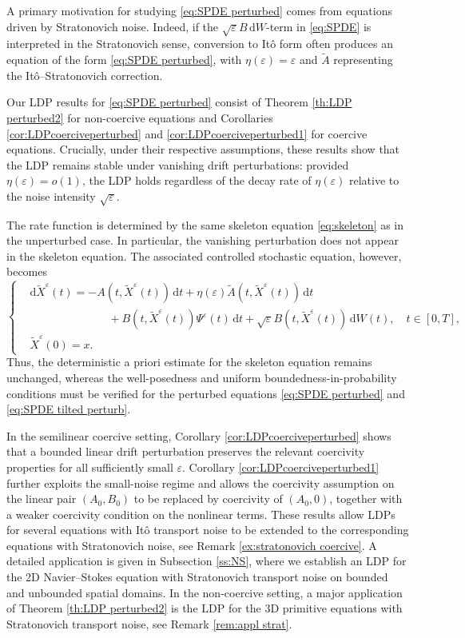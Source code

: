 \documentclass{amsart}
\newcommand{\dd}{\,\mathrm{d}}
\newcommand{\ddd}{\mathrm{d}}
\newcommand{\<}{\langle}
\newcommand{\?}{\rangle}
\theoremstyle{plain}
\theoremstyle{remark}
\theoremstyle{plain}
\numberwithin{equation}{section}
\newcommand{\eps}{\varepsilon}
\begin{document}
A primary motivation for studying  \eqref{eq:SPDE perturbed} comes from equations driven by Stratonovich noise. Indeed, if the $\sqrt{\eps}B\dd W$-term in \eqref{eq:SPDE} is interpreted in the
Stratonovich sense, conversion to It\^o form often produces an equation of the form \eqref{eq:SPDE perturbed}, with $\eta(\eps)=\eps$ and $\tilde A$ representing the
It\^o--Stratonovich correction.  

Our LDP results for \eqref{eq:SPDE perturbed} consist of Theorem \ref{th:LDP perturbed2} for non-coercive equations and Corollaries  \ref{cor:LDPcoerciveperturbed} and \ref{cor:LDPcoerciveperturbed1} for coercive equations. 
Crucially, under their respective assumptions, these results show that the LDP remains stable under vanishing drift perturbations: provided $\eta(\eps)={o}(1)$, the LDP holds regardless of the decay rate of $\eta(\eps)$ relative to the noise intensity  $\sqrt{\eps}$.  

The rate function is determined by the same skeleton equation \eqref{eq:skeleton} as in the unperturbed case. In particular, the vanishing perturbation does not appear in the skeleton equation.
The associated controlled stochastic equation, however, becomes
\begin{equation}\label{eq:SPDE tilted perturb}
   \begin{cases}
  &\ddd \tilde{X}^\eps(t)=-A(t,\tilde{X}^\eps(t))\dd t+\eta(\eps)\tilde{A}(t,\tilde{X}^\eps(t))\dd t\\
  &\qquad\qquad\quad\qquad+B(t,\tilde{X}^\eps(t))\Psi^\eps(t)\dd t+\sqrt{\eps}B(t,\tilde{X}^\eps(t))\dd W(t), \quad t\in[0,T], \\
  &\tilde{X}^\eps(0)=x.
\end{cases}
\end{equation}   
Thus, the deterministic a priori estimate for the skeleton equation
remains unchanged, whereas the well-posedness and uniform
boundedness-in-probability conditions must be verified for the
perturbed equations \eqref{eq:SPDE perturbed} and
\eqref{eq:SPDE tilted perturb}. 


In the semilinear coercive setting, Corollary \ref{cor:LDPcoerciveperturbed} shows that a bounded linear drift perturbation preserves the relevant coercivity properties for all sufficiently small $\eps$. Corollary \ref{cor:LDPcoerciveperturbed1} further exploits the small-noise regime and allows the coercivity assumption on the linear pair $(A_0,B_0)$ to be replaced by coercivity of $(A_0,0)$, together with a weaker coercivity condition on the nonlinear terms. 
These results allow LDPs for several equations with It\^o transport noise to be extended to the corresponding equations with Stratonovich noise,  see Remark \ref{ex:stratonovich coercive}. A detailed application is given in Subsection \ref{ss:NS}, where we establish an LDP for the 2D  Navier--Stokes equation with Stratonovich transport noise on bounded and unbounded spatial domains. 
In the non-coercive setting, a major application of Theorem \ref{th:LDP perturbed2} is the LDP for the   3D primitive equations with Stratonovich transport noise, see Remark \ref{rem:appl strat}.
\end{document}
